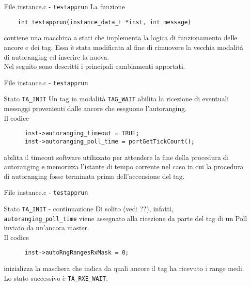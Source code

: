 \begin{frame}[fragile]{File instance.c - \lstinline!testapprun!}
  La funzione
  \begin{lstlisting}
    int testapprun(instance_data_t *inst, int message)
  \end{lstlisting}
  contiene una macchina a stati che implementa la logica di funzionamento delle ancore e dei tag.
  Essa è stata modificata al fine di rimuovere la vecchia modalità di autoranging ed inserire la nuova.\\
  Nel seguito sono descritti i principali \alert{cambiamenti} apportati.
\end{frame}

\begin{frame}[fragile]{File instance.c - \lstinline!testapprun!}
  \begin{block}{Stato \lstinline!TA_INIT!}
    Un tag in modalità \lstinline!TAG_WAIT! abilita la ricezione di eventuali messaggi
    provenienti dalle ancore che eseguono l'autoranging.\\
    Il codice
    \begin{lstlisting}
      inst->autoranging_timeout = TRUE;
      inst->autoranging_poll_time = portGetTickCount();
    \end{lstlisting}
    abilita il timeout software utilizzato per attendere la fine della procedura di autoranging e
    memorizza l'istante di tempo corrente nel caso in cui la procedura di autoranging fosse terminata
    prima dell'accensione del tag.
  \end{block}
\end{frame}

\begin{frame}[fragile]{File instance.c - \lstinline!testapprun!}
  \begin{block}{Stato \lstinline!TA_INIT! - continuazione}
    Di solito (vedi ??), infatti, \lstinline!autoranging_poll_time! viene assegnato
    alla ricezione da parte del tag di un Poll inviato da un'ancora master.\\
    Il codice
    \begin{lstlisting}
      inst->autoRngRangesRxMask = 0;
    \end{lstlisting}
    inizializza la maschera che indica da quali ancore il tag ha ricevuto i range medi.\\
    \alert{Lo stato successivo} è \lstinline!TA_RXE_WAIT!.
  \end{block}
\end{frame}

